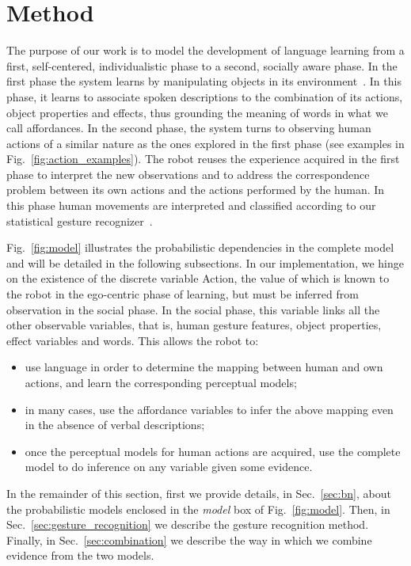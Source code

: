 \section{Method}
\label{sec:method}

The purpose of our work is to model the development of language learning from a first, self-centered, individualistic phase to a second, socially aware phase.
In the first phase the system learns by manipulating objects in its environment~\cite{salvi:2012:smcb}.
In this phase, it learns to associate spoken descriptions to the combination of its actions, object properties and effects, thus grounding the meaning of words in what we call affordances.
In the second phase, the system turns to observing human actions of a similar nature as the ones explored in the first phase (see examples in Fig.~\ref{fig:action_examples}).
The robot reuses the experience acquired in the first phase to interpret the new observations and to address the correspondence problem between its own actions and the actions performed by the human.
In this phase human movements are interpreted and classified according to our statistical gesture recognizer~\cite{saponaro:2013:crhri}.

Fig.~\ref{fig:model} illustrates the probabilistic dependencies in the complete model and will be detailed in the following subsections.
In our implementation, we hinge on the existence of the discrete variable Action, the value of which is known to the robot in the ego-centric phase of learning, but must be inferred from observation in the social phase.
In the social phase, this variable links all the other observable variables, that is, human gesture features, object properties, effect variables and words.
This allows the robot to:
\begin{itemize}
\item use language in order to determine the mapping between human and own actions, and learn the corresponding perceptual models;

\item in many cases, use the affordance variables to infer the above mapping even in the absence of verbal descriptions;

\item once the perceptual models for human actions are acquired, use the complete model to do inference on any variable given some evidence.
\end{itemize}
In the remainder of this section, first we provide details, in Sec.~\ref{sec:bn}, about the probabilistic models enclosed in the \emph{\AffWords{} model} box of Fig.~\ref{fig:model}.
Then, in Sec.~\ref{sec:gesture_recognition} we describe the gesture recognition method.
Finally, in Sec.~\ref{sec:combination} we describe the way in which we combine evidence from the two models.

